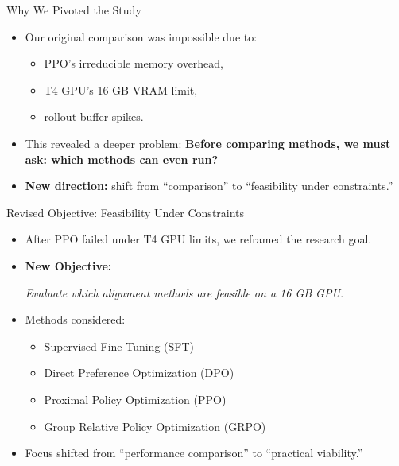 \documentclass[10pt]{beamer}
\begin{document}
\begin{frame}{Why We Pivoted the Study}
\large
\begin{itemize}
    \item Our original comparison was impossible due to:
    \begin{itemize}
        \item PPO's irreducible memory overhead,
        \item T4 GPU’s 16 GB VRAM limit,
        \item rollout-buffer spikes.
    \end{itemize}

    \vspace{0.35cm}

    \item This revealed a deeper problem: \textbf{Before comparing methods, we must ask: which methods  can even run?}


    \vspace{0.35cm}

    \item \textbf{New direction:} shift from “comparison” to “feasibility under constraints.”
\end{itemize}
\end{frame}


\begin{frame}{Revised Objective: Feasibility Under Constraints}
    \large
    \begin{itemize}
        \setlength\itemsep{1em} %
        
        \item After PPO failed under T4 GPU limits, we reframed the research goal.
    
        \item \textbf{New Objective:}
        \begin{center}
            \textit{Evaluate which alignment methods are feasible on a 16 GB GPU.}
        \end{center}
    
        \item Methods considered:
        \begin{itemize}
            \setlength\itemsep{0.3em} %
            \item Supervised Fine-Tuning (SFT)
            \item Direct Preference Optimization (DPO)
            \item Proximal Policy Optimization (PPO)
            \item Group Relative Policy Optimization (GRPO)
        \end{itemize}
    
        \item Focus shifted from ``performance comparison'' to ``practical viability.''
    \end{itemize}
\end{frame}
\end{document}
